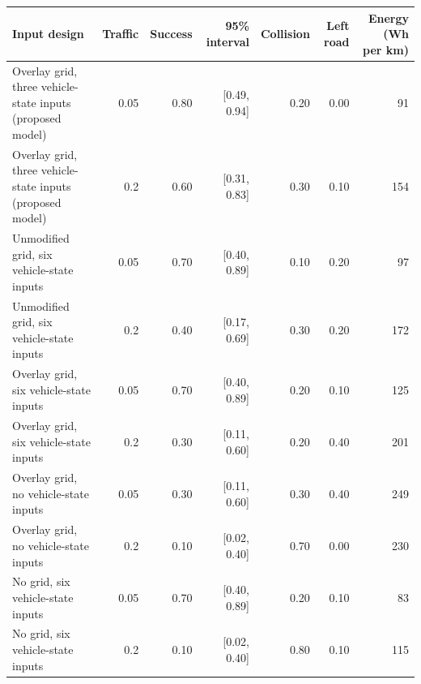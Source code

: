 \begin{tabular}{@{}lrrrrrr@{}}\toprule
Input design & Traffic & Success & 95\% interval & Collision & Left road & Energy (Wh per km)\\\midrule
Overlay grid, three vehicle-state inputs (proposed model) & 0.05 & 0.80 & [0.49, 0.94] & 0.20 & 0.00 & 91\\
Overlay grid, three vehicle-state inputs (proposed model) & 0.2 & 0.60 & [0.31, 0.83] & 0.30 & 0.10 & 154\\
Unmodified grid, six vehicle-state inputs & 0.05 & 0.70 & [0.40, 0.89] & 0.10 & 0.20 & 97\\
Unmodified grid, six vehicle-state inputs & 0.2 & 0.40 & [0.17, 0.69] & 0.30 & 0.20 & 172\\
Overlay grid, six vehicle-state inputs & 0.05 & 0.70 & [0.40, 0.89] & 0.20 & 0.10 & 125\\
Overlay grid, six vehicle-state inputs & 0.2 & 0.30 & [0.11, 0.60] & 0.20 & 0.40 & 201\\
Overlay grid, no vehicle-state inputs & 0.05 & 0.30 & [0.11, 0.60] & 0.30 & 0.40 & 249\\
Overlay grid, no vehicle-state inputs & 0.2 & 0.10 & [0.02, 0.40] & 0.70 & 0.00 & 230\\
No grid, six vehicle-state inputs & 0.05 & 0.70 & [0.40, 0.89] & 0.20 & 0.10 & 83\\
No grid, six vehicle-state inputs & 0.2 & 0.10 & [0.02, 0.40] & 0.80 & 0.10 & 115\\
\bottomrule\end{tabular}
